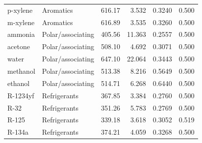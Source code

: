 \begin{table}[H]
\begin{tabular}{llrrrr}
p-xylene & Aromatics & 616.17 & 3.532 & 0.3240 & 0.500 \\
m-xylene & Aromatics & 616.89 & 3.535 & 0.3260 & 0.500 \\
ammonia & Polar/associating & 405.56 & 11.363 & 0.2557 & 0.500 \\
acetone & Polar/associating & 508.10 & 4.692 & 0.3071 & 0.500 \\
water & Polar/associating & 647.10 & 22.064 & 0.3443 & 0.500 \\
methanol & Polar/associating & 513.38 & 8.216 & 0.5649 & 0.500 \\
ethanol & Polar/associating & 514.71 & 6.268 & 0.6440 & 0.500 \\
R-1234yf & Refrigerants & 367.85 & 3.384 & 0.2760 & 0.500 \\
R-32 & Refrigerants & 351.26 & 5.783 & 0.2769 & 0.500 \\
R-125 & Refrigerants & 339.18 & 3.618 & 0.3052 & 0.519 \\
R-134a & Refrigerants & 374.21 & 4.059 & 0.3268 & 0.500 \\
\bottomrule
\end{tabular}
\end{table}
